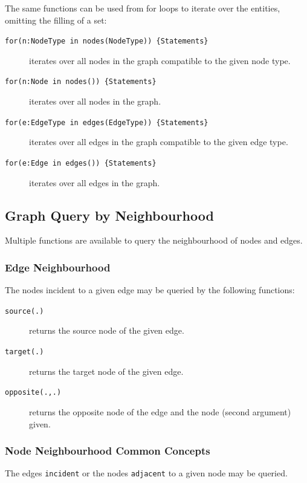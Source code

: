 The same functions can be used from for loops to iterate over the entities, omitting the filling of a set: 
\begin{description}
\item[\texttt{for(n:NodeType in nodes(NodeType)) \{Statements\}} ] iterates over all nodes in the graph compatible to the given node type.
\item[\texttt{for(n:Node in nodes()) \{Statements\}} ] iterates over all nodes in the graph.
\item[\texttt{for(e:EdgeType in edges(EdgeType)) \{Statements\}} ] iterates over all edges in the graph compatible to the given edge type.
\item[\texttt{for(e:Edge in edges()) \{Statements\}} ] iterates over all edges in the graph.
\end{description}

\subsection{Graph Query by Neighbourhood}\label{sub:querybyneighbourhood}

Multiple functions are available to query the neighbourhood of nodes and edges.

\subsubsection*{Edge Neighbourhood}

The nodes incident to a given edge may be queried by the following functions: 

\begin{description}
\item[\texttt{source(.)}] returns the source node of the given edge.
\item[\texttt{target(.)}] returns the target node of the given edge.
\item[\texttt{opposite(.,.)}] returns the opposite node of the edge and the node (second argument) given.
\end{description}

\subsubsection*{Node Neighbourhood Common Concepts}

The edges \texttt{incident} or the nodes \texttt{adjacent} to a given node may be queried.

